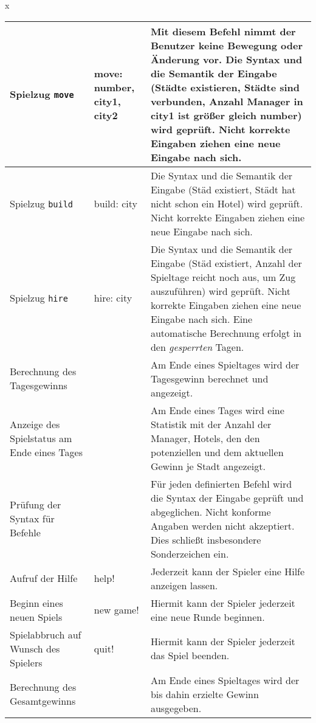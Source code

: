 \documentclass[a4paper]{article}
\begin{document}
\begin{exercise}{x}
\begin{center}
\begin{tabular}{| p{2.5cm} | p{2.2cm} | p{10cm} |}
		Spielzug \texttt{move} & move: number, city1, city2
		& Mit diesem Befehl nimmt der Benutzer keine Bewegung oder \"Anderung vor.
		Die Syntax und die Semantik der Eingabe (St\"adte existieren, St\"adte sind verbunden,
		Anzahl Manager in city1 ist gr\"o\ss{}er gleich number) wird gepr\"uft. Nicht korrekte Eingaben
		ziehen eine neue Eingabe nach sich. \\ \hline
		
		Spielzug \texttt{build} & build: city
		& Die Syntax und die Semantik der Eingabe (St\"ad existiert, St\"adt hat nicht schon ein
		Hotel) wird gepr\"uft. Nicht korrekte Eingaben
		ziehen eine neue Eingabe nach sich. \\ \hline
		
		Spielzug \texttt{hire} & hire: city
		& Die Syntax und die Semantik der Eingabe (St\"ad existiert, Anzahl der Spieltage reicht noch
		aus, um Zug auszuf\"uhren) wird gepr\"uft. Nicht korrekte Eingaben
		ziehen eine neue Eingabe nach sich. Eine automatische Berechnung erfolgt in den
		\emph{gesperrten} Tagen. \\ \hline
		
		Berechnung des Tagesgewinns &
		& Am Ende eines Spieltages wird der Tagesgewinn berechnet und angezeigt. \\ \hline
		
		Anzeige des Spielstatus am Ende eines Tages &
		& Am Ende eines Tages wird eine Statistik mit der Anzahl der Manager, Hotels, den
		den potenziellen und dem aktuellen Gewinn je Stadt angezeigt. \\ \hline
		
		Pr\"ufung der Syntax f\"ur Befehle &
		& F\"ur jeden definierten Befehl wird die Syntax der Eingabe gepr\"uft und abgeglichen.
		Nicht konforme Angaben werden nicht akzeptiert. Dies schlie\ss{}t insbesondere Sonderzeichen
		ein. \\ \hline
		
		Aufruf der Hilfe & help!
		& Jederzeit kann der Spieler eine Hilfe anzeigen lassen. \\ \hline
	
		Beginn eines neuen Spiels & new game!
		& Hiermit kann der Spieler jederzeit eine neue Runde beginnen. \\ \hline
		
		Spielabbruch auf Wunsch des Spielers & quit!
		& Hiermit kann der Spieler jederzeit das Spiel beenden. \\ \hline
		
		Berechnung des Gesamtgewinns &
		& Am Ende eines Spieltages wird der bis dahin erzielte Gewinn ausgegeben. \\ \hline
		

\end{tabular}
\end{center}
\end{exercise}
\end{document}
